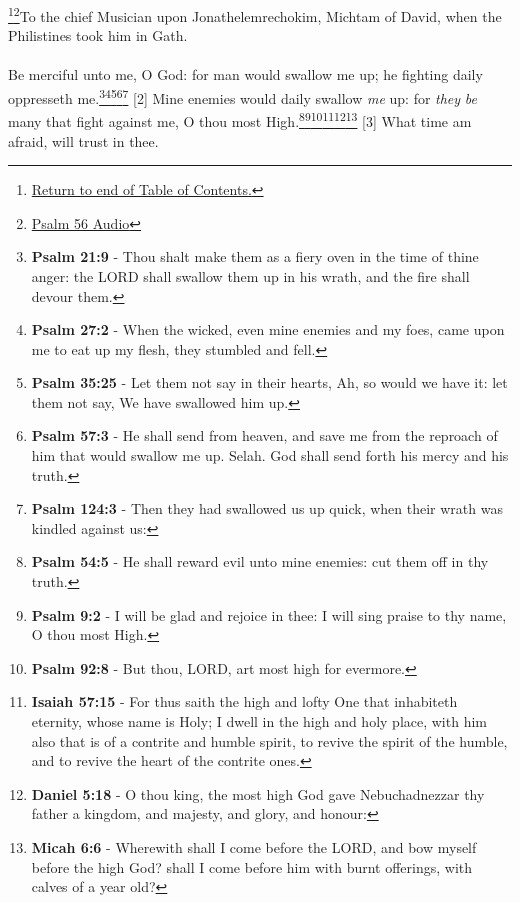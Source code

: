 \footnote{\textcolor[rgb]{0.00,0.25,0.00}{\hyperlink{PsalmsTOC}{Return to end of Table of Contents.}}}\footnote{\href{https://audiobible.com/bible/psalms_56.html}{\textcolor[cmyk]{0.99998,1,0,0}{Psalm 56 Audio}}}\textcolor[cmyk]{0.99998,1,0,0}{To the chief Musician upon Jonathelemrechokim, Michtam of David, when the Philistines took him in Gath.}\\
\\
\textcolor[cmyk]{0.99998,1,0,0}{Be merciful unto me, O God: for man would swallow me up; he fighting daily oppresseth me.}\footnote{\textbf{Psalm 21:9} - Thou shalt make them as a fiery oven in the time of thine anger: the LORD shall swallow them up in his wrath, and the fire shall devour them.}\footnote{\textbf{Psalm 27:2} - When the wicked, even mine enemies and my foes, came upon me to eat up my flesh, they stumbled and fell.}\footnote{\textbf{Psalm 35:25} - Let them not say in their hearts, Ah, so would we have it: let them not say, We have swallowed him up.}\footnote{\textbf{Psalm 57:3} - He shall send from heaven, and save me from the reproach of him that would swallow me up. Selah. God shall send forth his mercy and his truth.}\footnote{\textbf{Psalm 124:3} - Then they had swallowed us up quick, when their wrath was kindled against us:}
[2] \textcolor[cmyk]{0.99998,1,0,0}{Mine enemies would daily swallow \emph{me} up: for \emph{they} \emph{be} many that fight against me, O thou most High.}\footnote{\textbf{Psalm 54:5} - He shall reward evil unto mine enemies: cut them off in thy truth.}\footnote{\textbf{Psalm 9:2} - I will be glad and rejoice in thee: I will sing praise to thy name, O thou most High.}\footnote{\textbf{Psalm 92:8} - But thou, LORD, art most high for evermore.}\footnote{\textbf{Isaiah 57:15} - For thus saith the high and lofty One that inhabiteth eternity, whose name is Holy; I dwell in the high and holy place, with him also that is of a contrite and humble spirit, to revive the spirit of the humble, and to revive the heart of the contrite ones.}\footnote{\textbf{Daniel 5:18} - O thou king, the most high God gave Nebuchadnezzar thy father a kingdom, and majesty, and glory, and honour:}\footnote{\textbf{Micah 6:6} - Wherewith shall I come before the LORD, and bow myself before the high God? shall I come before him with burnt offerings, with calves of a year old?}
[3] \textcolor[cmyk]{0.99998,1,0,0}{What time  am afraid,  will trust in thee.}
